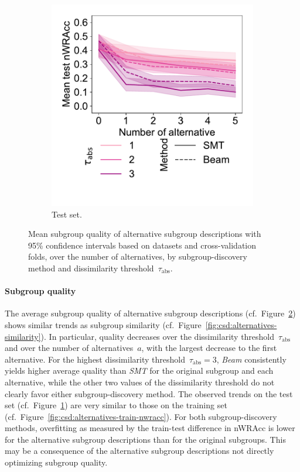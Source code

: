 \documentclass{article}
\theoremstyle{definition}
\begin{document}
\begin{figure}[t]
\begin{subfigure}[t]{0.48\textwidth}
		\includegraphics[width=\textwidth, trim=15 50 15 15, clip]{plots/csd-alternatives-test-nwracc.pdf}
		\caption{Test set.}
		\label{fig:csd:alternatives-test-nwracc}
	\end{subfigure}
	\caption{
		Mean subgroup quality of alternative subgroup descriptions with 95\% confidence intervals based on datasets and cross-validation folds, over the number of alternatives, by subgroup-discovery method and dissimilarity threshold~$\tau_{\text{abs}}$.
	}
	\label{fig:csd:alternatives-nwracc}
\end{figure}

\paragraph{Subgroup quality}

The average subgroup quality of alternative subgroup descriptions (cf.~Figure~\ref{fig:csd:alternatives-nwracc}) shows similar trends as subgroup similarity (cf.~Figure~\ref{fig:csd:alternatives-similarity}).
In particular, quality decreases over the dissimilarity threshold~$\tau_{\text{abs}}$ and over the number of alternatives~$a$, with the largest decrease to the first alternative.
For the highest dissimilarity threshold~$\tau_{\text{abs}} = 3$, \emph{Beam} consistently yields higher average quality than \emph{SMT} for the original subgroup and each alternative, while the other two values of the dissimilarity threshold do not clearly favor either subgroup-discovery method.
The observed trends on the test set (cf.~Figure~\ref{fig:csd:alternatives-test-nwracc}) are very similar to those on the training set (cf.~Figure~\ref{fig:csd:alternatives-train-nwracc}).
For both subgroup-discovery methods, overfitting as measured by the train-test difference in nWRAcc is lower for the alternative subgroup descriptions than for the original subgroups.
This may be a consequence of the alternative subgroup descriptions not directly optimizing subgroup quality.
\end{document}
